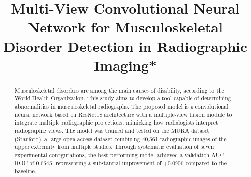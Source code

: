 \documentclass[conference]{IEEEtran}
\begin{document}
\title{Multi-View Convolutional Neural Network for Musculoskeletal Disorder Detection in Radiographic Imaging*\\
}

\author{
\and
{}
\and
{}
\and
{}
}

\maketitle

\begin{abstract}
Musculoskeletal disorders are among the main causes of disability, according to the World Health Organization. This study aims to develop a tool capable of determining abnormalities in musculoskeletal radiographs. The proposed model is a convolutional neural network based on ResNet18 architecture with a multiple-view fusion module to integrate multiple radiographic projections, mimicking how radiologists interpret radiographic views. The model was trained and tested on the MURA dataset (Stanford), a large open-access dataset combining 40,561 radiographic images of the upper extremity from multiple studies. Through systematic evaluation of seven experimental configurations, the best-performing model achieved a validation AUC-ROC of 0.6545, representing a substantial improvement of +0.0906 compared to the baseline.
\end{abstract}
\end{document}
